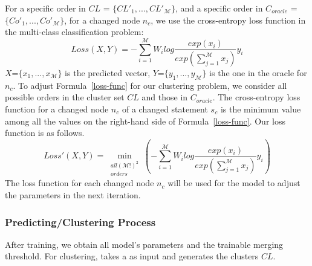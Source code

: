 For a specific order in $CL$ = $\{CL'_1,..., CL'_{\mathcal{M}}\}$, and
a specific order in $C_{oracle}$ = $\{Co'_{1},...,
Co'_{\mathcal{M}}\}$, for a changed node $n_c$, we use the
cross-entropy loss function in the multi-class classification problem:
\begin{equation}\label{loss-func}
	Loss(X,Y) = -\sum^{\mathcal{M}}_{i=1}W_ilog\frac{exp(x_i)}{exp(\sum^{\mathcal{M}}_{j=1}x_j)}y_i
\end{equation}
$X$=$\{x_1,...,x_{\mathcal{M}}\}$ is the predicted vector,
$Y$=$\{y_1,...,y_{\mathcal{M}}\}$ is the one in the oracle for $n_c$. To
adjust Formula~\ref{loss-func} for our clustering problem, we
consider all possible orders in the cluster set $CL$ and those in
$C_{oracle}$. The cross-entropy loss function for a changed node
$n_c$ of a changed statement $s_c$ is the minimum value among all the
values on the right-hand side of Formula~\ref{loss-func}. Our
loss function is as follows.
\begin{equation}\label{eq6}
	Loss'(X, Y)= \min\limits_{\substack{all (\mathcal{M}!)^{2}\\orders}}(-\sum^{\mathcal{M}}_{i=1}W_ilog\frac{exp(x_i)}{exp(\sum^{\mathcal{M}}_{j=1}x_j)}y_i)
\end{equation}
The loss function for each changed node $n_c$ will be used for
the model to adjust the parameters in the next iteration.


\subsubsection*{Predicting/Clustering Process}
After training, we obtain all model's parameters and the trainable
merging threshold. For clustering, {\tool} takes a {\mvpdg} as input
and generates the clusters $CL$.
